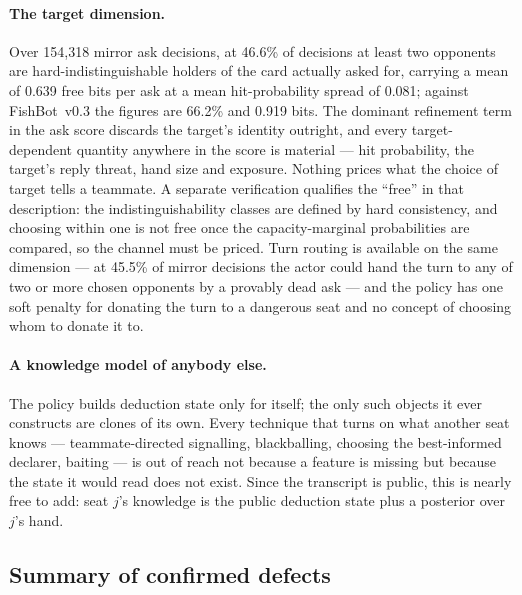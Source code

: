 \documentclass[11pt]{article}
\theoremstyle{definition}
\DeclareRobustCommand{\vthree}{\texorpdfstring{\mbox{FishBot v0.3}}{FishBot v0.3}}
\providecommand{\numAskDecisions}{154{,}318}
\providecommand{\numTargetTwo}{46.6}
\providecommand{\numTargetBits}{0.639}
\providecommand{\numTargetSpread}{0.081}
\providecommand{\numTargetTwoVthree}{66.2}
\providecommand{\numTargetBitsVthree}{0.919}
\providecommand{\numRouteTwo}{45.5}
\begin{document}
\paragraph{The target dimension.} Over \numAskDecisions{} mirror ask decisions,
at \numTargetTwo\% of decisions at least two opponents are hard-indistinguishable
holders of the card actually asked for, carrying a mean of \numTargetBits{} free
bits per ask at a mean hit-probability spread of \numTargetSpread{}; against
\vthree{} the figures are \numTargetTwoVthree\% and \numTargetBitsVthree{} bits.
The dominant refinement term in the ask score discards the target's identity
outright, and every target-dependent quantity anywhere in the score is material
--- hit probability, the target's reply threat, hand size and exposure. Nothing
prices what the choice of target tells a teammate. A separate verification
qualifies the ``free'' in that description: the indistinguishability classes are
defined by hard consistency, and choosing within one is not free once the
capacity-marginal probabilities are compared, so the channel must be priced.
Turn routing is available on the same dimension --- at \numRouteTwo\% of mirror
decisions the actor could hand the turn to any of two or more chosen opponents by
a provably dead ask --- and the policy has one soft penalty for donating the turn
to a dangerous seat and no concept of choosing whom to donate it to.

\paragraph{A knowledge model of anybody else.} The policy builds deduction state
only for itself; the only such objects it ever constructs are clones of its own.
Every technique that turns on what another seat knows --- teammate-directed
signalling, blackballing, choosing the best-informed declarer, baiting --- is out
of reach not because a feature is missing but because the state it would read
does not exist. Since the transcript is public, this is nearly free to add:
seat $j$'s knowledge is the public deduction state plus a posterior over $j$'s
hand.

\subsection{Summary of confirmed defects}
\label{sec:diag-summary}
\end{document}
